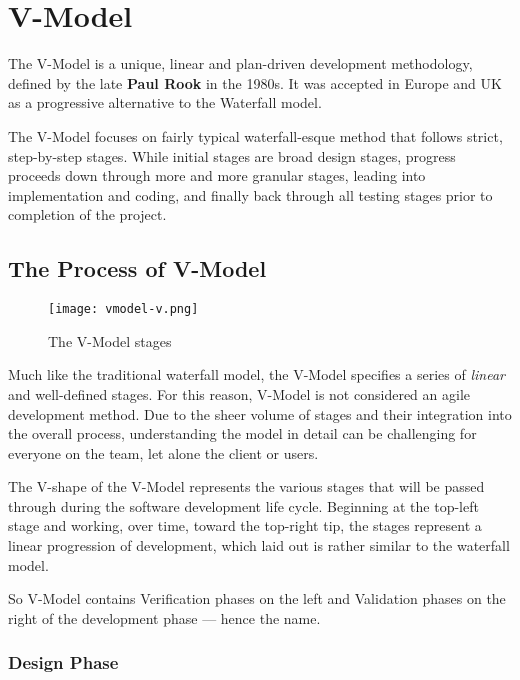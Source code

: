 \documentclass[main.tex]{subfiles}
\begin{document}
\section{V-Model}

The V-Model is a unique, linear and plan-driven development methodology, defined by the late \textbf{Paul Rook} in the 1980s.
It was accepted in Europe and UK as a progressive alternative to the Waterfall model.

The V-Model focuses on fairly typical waterfall-esque method that follows strict, step-by-step stages. While initial stages are broad design stages, progress proceeds down through more and more granular stages, leading into implementation and coding, and finally back through all testing stages prior to completion of the project.

\subsection{The Process of V-Model}

\begin{wrapfigure}[13]{l}[2em]{0.6\textwidth}
	\vspace*{-\baselineskip}
	\texttt{[image: vmodel-v.png]}
	\caption{The V-Model stages\label{fig:vmodel-v}}
\end{wrapfigure}

Much like the traditional waterfall model, the V-Model specifies a series of \emph{linear} and well-defined stages.
For this reason, V-Model is not considered an agile development method. Due to the sheer volume of stages and their integration into the overall process, understanding the model in detail can be challenging for everyone on the team, let alone the client or users.

The V-shape of the V-Model represents the various stages that will be passed through during the software development life cycle.
Beginning at the top-left stage and working, over time, toward the top-right tip, the stages represent a linear progression of development, which laid out is rather similar to the waterfall model.

So V-Model contains Verification phases on the left and Validation phases on the right of the development phase --- hence the name.

\subsubsection{Design Phase}
\end{document}

